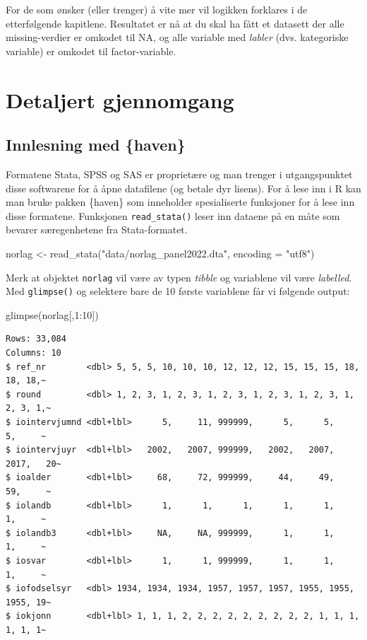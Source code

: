 \documentclass[
  letterpaper,
  DIV=11,
  numbers=noendperiod]{scrreprt}
\newenvironment{Shaded}{\begin{snugshade}}{\end{snugshade}}
\newcommand{\AttributeTok}[1]{\textcolor[rgb]{0.40,0.45,0.13}{#1}}
\newcommand{\DecValTok}[1]{\textcolor[rgb]{0.68,0.00,0.00}{#1}}
\newcommand{\FunctionTok}[1]{\textcolor[rgb]{0.28,0.35,0.67}{#1}}
\newcommand{\NormalTok}[1]{\textcolor[rgb]{0.00,0.23,0.31}{#1}}
\newcommand{\OtherTok}[1]{\textcolor[rgb]{0.00,0.23,0.31}{#1}}
\newcommand{\SpecialCharTok}[1]{\textcolor[rgb]{0.37,0.37,0.37}{#1}}
\newcommand{\StringTok}[1]{\textcolor[rgb]{0.13,0.47,0.30}{#1}}
\begin{document}
For de som ønsker (eller trenger) å vite mer vil logikken forklares i de
etterfølgende kapitlene. Resultatet er nå at du skal ha fått et datasett
der alle missing-verdier er omkodet til NA, og alle variable med
\emph{labler} (dvs. kategoriske variable) er omkodet til
factor-variable.

\hypertarget{detaljert-gjennomgang}{%
\section{Detaljert gjennomgang}\label{detaljert-gjennomgang}}

\hypertarget{innlesning-med-haven}{%
\subsection{Innlesning med \{haven\}}\label{innlesning-med-haven}}

Formatene Stata, SPSS og SAS er proprietære og man trenger i
utgangspunktet disse softwarene for å åpne datafilene (og betale dyr
lisens). For å lese inn i R kan man bruke pakken \{haven\} som
inneholder spesialiserte funksjoner for å lese inn disse formatene.
Funksjonen \texttt{read\_stata()} leser inn dataene på en måte som
bevarer særegenhetene fra Stata-formatet.

\begin{Shaded}
\begin{Highlighting}[]
\NormalTok{norlag }\OtherTok{\textless{}{-}} \FunctionTok{read\_stata}\NormalTok{(}\StringTok{"data/norlag\_panel2022.dta"}\NormalTok{, }\AttributeTok{encoding =} \StringTok{"utf8"}\NormalTok{) }
\end{Highlighting}
\end{Shaded}

Merk at objektet \texttt{norlag} vil være av typen \emph{tibble} og
variablene vil være \emph{labelled}. Med \texttt{glimpse()} og selektere
bare de 10 første variablene får vi følgende output:

\begin{Shaded}
\begin{Highlighting}[]
\FunctionTok{glimpse}\NormalTok{(norlag[,}\DecValTok{1}\SpecialCharTok{:}\DecValTok{10}\NormalTok{])}
\end{Highlighting}
\end{Shaded}

\begin{verbatim}
Rows: 33,084
Columns: 10
$ ref_nr        <dbl> 5, 5, 5, 10, 10, 10, 12, 12, 12, 15, 15, 15, 18, 18, 18,~
$ round         <dbl> 1, 2, 3, 1, 2, 3, 1, 2, 3, 1, 2, 3, 1, 2, 3, 1, 2, 3, 1,~
$ iointervjumnd <dbl+lbl>      5,     11, 999999,      5,      5,      5,     ~
$ iointervjuyr  <dbl+lbl>   2002,   2007, 999999,   2002,   2007,   2017,   20~
$ ioalder       <dbl+lbl>     68,     72, 999999,     44,     49,     59,     ~
$ iolandb       <dbl+lbl>      1,      1,      1,      1,      1,      1,     ~
$ iolandb3      <dbl+lbl>     NA,     NA, 999999,      1,      1,      1,     ~
$ iosvar        <dbl+lbl>      1,      1, 999999,      1,      1,      1,     ~
$ iofodselsyr   <dbl> 1934, 1934, 1934, 1957, 1957, 1957, 1955, 1955, 1955, 19~
$ iokjonn       <dbl+lbl> 1, 1, 1, 2, 2, 2, 2, 2, 2, 2, 2, 2, 1, 1, 1, 1, 1, 1~
\end{verbatim}
\end{document}
